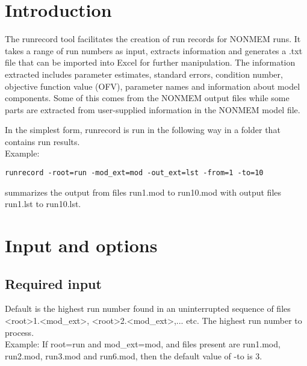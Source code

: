 
\usepackage{hyperref}


\maketitle
\tableofcontents
\newpage
\section{Introduction}

The runrecord tool facilitates the creation of run records for NONMEM runs. It takes a range of run numbers as input, extracts information and generates a .txt file that can be imported into Excel for further manipulation. The information extracted includes parameter estimates, standard errors, condition number, objective function value (OFV), parameter names and information about model components. Some of this comes from the NONMEM output files while some parts are extracted from user-supplied information in the NONMEM model file. 

In the simplest form, runrecord is run in the following way in a folder that contains run results.\\
Example:
\begin{verbatim}
runrecord -root=run -mod_ext=mod -out_ext=lst -from=1 -to=10
\end{verbatim}
summarizes the output from files run1.mod to run10.mod with output files run1.lst to run10.lst.
\newpage

\section{Input and options}
\subsection{Required input}
\begin{optionlist}
Default is the highest run number found in an uninterrupted sequence of files <root>1.<mod\_ext>, <root>2.<mod\_ext>,... etc. The highest run number to process.\\
Example: If root=run and mod\_ext=mod, and files present are run1.mod, run2.mod, run3.mod and run6.mod, then the default value of -to is 3.
\nextopt
\end{optionlist}
